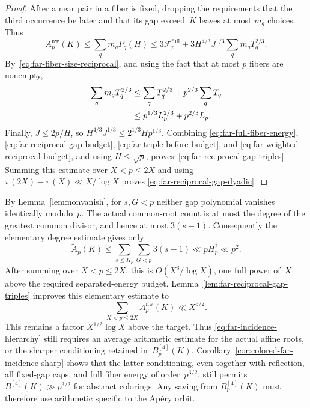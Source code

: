 \begin{proof}
After a near pair in a fiber is fixed, dropping the requirements that the
third occurrence be later and that its gap exceed~$K$ leaves at most
$m_q$ choices.  Thus
\begin{equation}
 A_p^{\mathrm{nw}}(K)
 \le\sum_qm_qP_q(H)
 \le3\mathcal F_p^{\mathrm{full}}
 +3H^{4/3}J^{1/3}\sum_qm_qT_q^{2/3}.
\label{eq:far-triple-before-budget}
\end{equation}
By~\eqref{eq:far-fiber-size-reciprocal}, and using the fact that at most
$p$ fibers are nonempty,
\begin{align}
 \sum_qm_qT_q^{2/3}
 &\le\sum_qT_q^{2/3}+p^{2/3}\sum_qT_q \notag\\
 &\le p^{1/3}L_p^{2/3}+p^{2/3}L_p.
\label{eq:far-weighted-reciprocal-budget}
\end{align}
Finally, $J\le2p/H$, so
$H^{4/3}J^{1/3}\le2^{1/3}Hp^{1/3}$.  Combining
\eqref{eq:far-full-fiber-energy},
\eqref{eq:far-reciprocal-gap-budget},
\eqref{eq:far-triple-before-budget}, and
\eqref{eq:far-weighted-reciprocal-budget}, and using
$H\le\sqrt p$, proves~\eqref{eq:far-reciprocal-gap-triples}.
Summing this estimate over $X<p\le2X$ and using
$\pi(2X)-\pi(X)\ll X/\log X$ proves
\eqref{eq:far-reciprocal-gap-dyadic}.
\end{proof}

\begin{remark}
By Lemma~\ref{lem:nonvanish}, for $s,G<p$ neither gap polynomial vanishes
identically modulo~$p$.  The actual common-root count is at most the degree
of the greatest common divisor, and hence at most $3(s-1)$.  Consequently
the elementary degree estimate gives only
\[
 \widetilde A_p(K)
 \le\sum_{s\le H_p}\sum_{G<p}3(s-1)\ll pH_p^2\ll p^2.
\]
After summing over $X<p\le2X$, this is
$O(X^3/\log X)$, one full power of~$X$ above the required separated-energy
budget.  Lemma~\ref{lem:far-reciprocal-gap-triples} improves this elementary
estimate to
\[
 \sum_{X<p\le2X}A_p^{\mathrm{nw}}(K)
 \ll X^{5/2}.
\]
This remains a factor $X^{1/2}\log X$ above the target.  Thus
\eqref{eq:far-incidence-hierarchy} still requires an average arithmetic
estimate for the actual affine roots, or the sharper conditioning retained
in~$B_p^{[4]}(K)$.  Corollary~\ref{cor:colored-far-incidence-sharp} shows
that the latter conditioning, even together with reflection, all fixed-gap
caps, and full fiber energy of order~$p^{3/2}$, still permits
$B^{[4]}(K)\gg p^{3/2}$ for abstract colorings.  Any saving from
$B_p^{[4]}(K)$ must therefore use arithmetic specific to the Ap\'ery orbit.
\end{remark}
